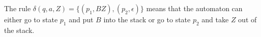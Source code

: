 

\setcounter{section}{6}
\setcounter{subsection}{1}
\setcounter{dfn}{1}

\begin{exl}
The rule $\delta(q, a, Z) = \{(p_1, BZ), (p_2, \epsilon)\}$ means that the automaton can either go to state $p_1$ and put $B$ into the stack
or go to state $p_2$ and take $Z$ out of the stack.
\end{exl}



